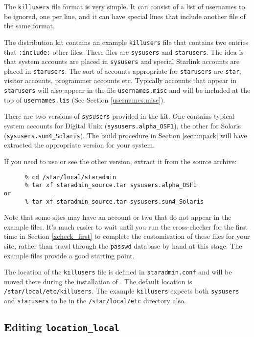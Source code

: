 The {\tt killusers} file format is very simple. It can consist of a list of
usernames to be ignored, one per line, and it can have special lines that
include another file of the same format. 

The distribution kit contains an example {\tt killusers} file that contains two 
entries that {\tt :include:} other files. These files are {\tt sysusers} and
{\tt starusers}. The idea is that system accounts are placed in {\tt sysusers}
and special Starlink accounts are placed in {\tt starusers}. The sort of
accounts appropriate for {\tt starusers} are {\tt star}, visitor accounts,
programmer accounts etc. Typically accounts that appear in {\tt starusers} will
also appear in the file {\tt usernames.misc} and will be included at the top of
{\tt usernames.lis} (See Section \ref{usernames.misc}).

There are two versions of {\tt sysusers} provided in the kit. One contains
typical system accounts for Digital Unix ({\tt sysusers.alpha\_OSF1}), the
other for Solaris ({\tt sysusers.sun4\_Solaris}).  The build procedure in
Section \ref{sec:unpack} will have extracted the appropriate version for
your system.  

If you need to use or see the other version, extract it from the source
archive:

\begin{verbatim}
      % cd /star/local/staradmin
      % tar xf staradmin_source.tar sysusers.alpha_OSF1
or
      % tar xf staradmin_source.tar sysusers.sun4_Solaris
\end{verbatim}

Note that some sites may have an account or two that do not appear in
the example files. It's much easier to wait until you run the
cross-checker for the first time in Section \ref{xcheck_first} to
complete the customisation of these files for your site, rather than
trawl through the {\tt passwd} database by hand at this stage. The
example files provide a good starting point.

The location of the {\tt killusers} file is defined in {\tt staradmin.conf}
and will be moved there during the installation of \staradmin. The default
location is {\tt /star/local/etc/killusers}. The example {\tt killusers} 
expects both {\tt sysusers} and {\tt starusers} to be in the 
{\tt /star/local/etc} directory also.

\subsection{Editing {\tt location\_local}}

